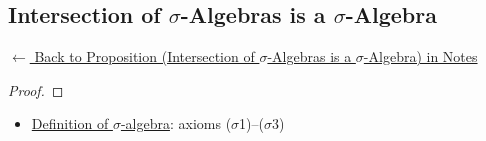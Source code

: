 
\subsection*{Intersection of $\sigma$-Algebras is a $\sigma$-Algebra}
\label{prf:intersection-sigma-algebras}

\begin{remark*}[Return]
\hyperref[prop:intersection-sigma-algebras]{$\leftarrow$ Back to Proposition (Intersection of $\sigma$-Algebras is a $\sigma$-Algebra) in Notes}
\end{remark*}

\begin{proof}
\end{proof}

\begin{remark*}

\end{remark*}

\begin{remark*}[Dependencies]
\begin{itemize}
  \item \hyperref[def:sigma-algebra]{Definition of $\sigma$-algebra}: axioms ($\sigma$1)--($\sigma$3)
\end{itemize}

\end{remark*}
